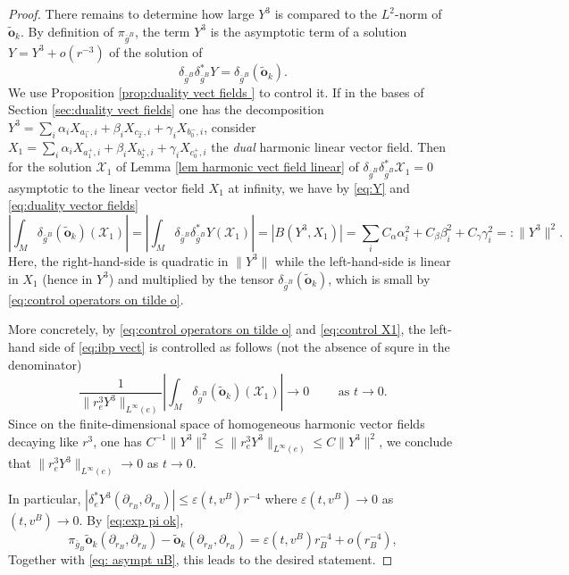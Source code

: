 \documentclass[11pt,reqno]{amsart}
\numberwithin{equation}{section}
\theoremstyle{definition}
\theoremstyle{remark}
\begin{document}
\begin{proof}
There remains to determine how large $Y^3$ is compared to the $L^2$-norm of $\tilde{\mathbf{o}}_k$. By definition of $\pi_{\bar{g}^B}$, the term $Y^3$ is the asymptotic term of a solution $Y = Y^3+o(r^{-3})$ of the solution of 
\begin{equation}\label{eq:Y}
    \delta_{\bar{g}^B}\delta_{\bar{g}^B}^* Y =\delta_{\bar{g}^B}(\tilde{\mathbf{o}}_k).
\end{equation}
We use Proposition \ref{prop:duality vect fields
} to control it. If in the bases of Section \ref{sec:duality vect fields} one has the decomposition $Y^3=\sum_i\alpha_i X_{a_1^-,i} + \beta_i X_{c_2^-,i} + \gamma_i X_{b_0^-,i}$, consider $X_1 = \sum_i\alpha_i X_{a_1^+,i} + \beta_i X_{b_2^+,i} + \gamma_i X_{c_0^+,i}$ the \textit{dual} harmonic linear vector field. Then for the solution $\mathcal{X}_1$ of Lemma \ref{lem harmonic vect field linear} of $\delta_{\bar{g}^B}\delta_{\bar{g}^B}^*\mathcal{X}_1=0$ asymptotic to the linear vector field $X_1$ at infinity, we have by \eqref{eq:Y} and \eqref{eq:duality vector fields}
\begin{equation}\label{eq:ibp vect}
 \left|\int_M\delta_{\bar{g}^B}(\tilde{\mathbf{o}}_k)(\mathcal{X}_1)\right| = \left|\int_M \delta_{\bar{g}^B}\delta_{\bar{g}^B}^* Y (\mathcal{X}_1) \right| = \left|B(Y^3,X_1)\right| = \sum_iC_\alpha\alpha_i ^2 + C_\beta\beta_i ^2 + C_\gamma\gamma_i^2=:\|Y^3\|^2.
\end{equation}
Here, the right-hand-side is quadratic in $\|Y^3\|$ while the left-hand-side is linear in $X_1$ (hence in $Y^3$) and multiplied by the tensor $\delta_{\bar{g}^B}(\tilde{\mathbf{o}}_k)$, which is small by \eqref{eq:control operators on tilde o}. 

More concretely, by \eqref{eq:control operators on tilde o} and \eqref{eq:control X1}, the left-hand side of \eqref{eq:ibp vect} is controlled as follows (not the absence of squre in the denominator)
$$\frac{1}{\|r_e^3Y^3\|_{L^\infty(e)}}\left|\int_M\delta_{\bar{g}^B}(\tilde{\mathbf{o}}_k)(\mathcal{X}_1)\right|\to 0\qquad \text{ as } t\to 0.$$
Since on the finite-dimensional space of homogeneous harmonic vector fields decaying like $r^3$, one has $C^{-1}\|Y^3\|^2\leqslant \|r_e^3Y^3\|_{L^\infty(e)}\leqslant C\|Y^3\|^2$, we conclude that $\|r_e^3Y^3\|_{L^\infty(e)}\to 0$ as $t\to 0$.

In particular, $|\delta_{e}^*Y^3(\partial_{r_B},\partial_{r_B})|\leqslant \varepsilon(t ,v ^B) r^{-4}$ where $\varepsilon(t ,v ^B)\to 0$ as $(t ,v ^B)\to 0$. By \eqref{eq:exp pi ok}, 
\begin{equation}\label{eq:dvp pi g ok}
\pi_{\bar{g}_B}\tilde{\mathbf{o}}_k(\partial_{r_B},\partial_{r_B}) - \tilde{\mathbf{o}}_k(\partial_{r_B},\partial_{r_B}) = \varepsilon(t ,v ^B)r_B^{-4} + o(r_B^{-4}),
\end{equation}
 Together with \eqref{eq: asympt uB}, this leads to the desired statement.
\end{proof}
\end{document}
